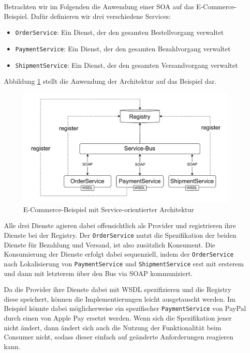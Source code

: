 \documentclass[acmtog]{acmart}
\begin{document}
Betrachten wir im Folgenden die Anwendung einer SOA auf das E-Commerce-Beispiel.
Dafür definieren wir drei verschiedene Services:
\begin{itemize}
  \item \texttt{OrderService}: Ein Dienst, der den gesamten Bestellvorgang verwaltet
  \item \texttt{PaymentService}: Ein Dienst, der den gesamten Bezahlvorgang verwaltet
  \item \texttt{ShipmentService}: Ein Dienst, der den gesamten Versandvorgang verwaltet
\end{itemize}

Abbildung \ref{fig:soaecommerce} stellt die Anwendung der Architektur auf das Beispiel dar.
\begin{figure}[!h]
  \centering
  \includegraphics[width=0.8\linewidth]{images/soa/soa-example.pdf}
  \caption{E-Commerce-Beispiel mit Service-orientierter Architektur}
  \label{fig:soaecommerce}
\end{figure}

Alle drei Dienste agieren dabei offensichtlich als Provider und registrieren ihre Dienste bei der Registry.
Der \texttt{OrderService} nutzt die Spezifikation der beiden Dienste für Bezahlung und Versand, ist also zusätzlich Konsument.
Die Konsumierung der Dienste erfolgt dabei sequenziell, indem der \texttt{OrderService} nach Lokalisierung von \texttt{PaymentService} und \texttt{ShipmentService}
erst mit ersterem und dann mit letzterem über den Bus via SOAP kommuniziert.

Da die Provider ihre Dienste dabei mit WSDL spezifizieren und die Registry diese speichert, können die Implementierungen leicht ausgetauscht werden.
Im Beispiel könnte dabei möglicherweise ein spezifischer \texttt{PaymentService} von PayPal durch einen von Apple Pay ersetzt werden.
Wenn sich die Spezifikation jener nicht ändert, dann ändert sich auch die Nutzung der Funktionalität beim Consumer nicht, sodass dieser einfach
auf geänderte Anforderungen reagieren kann.
\end{document}
